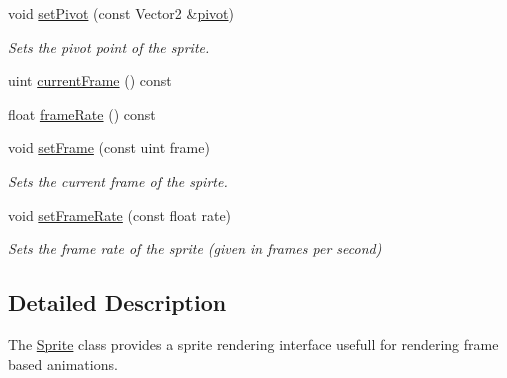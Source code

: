 \begin{DoxyCompactItemize}
void \hyperlink{class_sprite_a2718e3123c9b274c45aab67783d95e29}{set\-Pivot} (const Vector2 \&\hyperlink{class_sprite_a7a374e768581b432685d98af1a3831ef}{pivot})
\begin{DoxyCompactList}\small\item\em Sets the pivot point of the sprite. \end{DoxyCompactList}\item 
uint \hyperlink{class_sprite_a7ae3403d0bafe1db66324e6629cf2241}{current\-Frame} () const 
\item 
float \hyperlink{class_sprite_ae3dddbd019c5bc1498bacf7e3179781e}{frame\-Rate} () const 
\item 
void \hyperlink{class_sprite_a37528ab781412b775c583e020d9fce5a}{set\-Frame} (const uint frame)
\begin{DoxyCompactList}\small\item\em Sets the current frame of the spirte. \end{DoxyCompactList}\item 
void \hyperlink{class_sprite_a527959963c0e938beef3b130fcd724d8}{set\-Frame\-Rate} (const float rate)
\begin{DoxyCompactList}\small\item\em Sets the frame rate of the sprite (given in frames per second) \end{DoxyCompactList}\end{DoxyCompactItemize}


\subsection{Detailed Description}
The \hyperlink{class_sprite}{Sprite} class provides a sprite rendering interface usefull for rendering frame based animations. 


